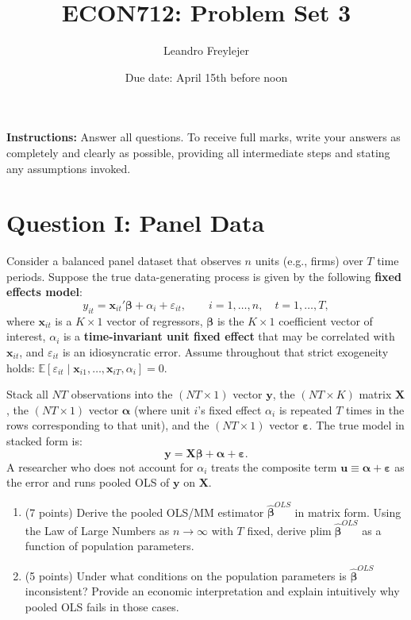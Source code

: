 \documentclass[letterpaper,12pt]{article}
\title{\vspace{-.5in} ECON712: Problem Set 3}
\author{Leandro Freylejer}
\date{Due date: April 15th before noon }
\begin{document}

\maketitle
\vspace{-.3in}
\textbf{Instructions:} Answer all questions. To receive full marks, write your answers as completely and clearly as possible, providing all intermediate steps and stating any assumptions invoked.


\section*{Question I: Panel Data}

Consider a balanced panel dataset that observes $n$ units (e.g., firms) over $T$ time periods. Suppose the true data-generating process is given by the following \textbf{fixed effects model}:
\begin{equation}
    y_{it} = \bm{x}_{it}'\bm{\beta} + \alpha_i + \varepsilon_{it}, \qquad i = 1,\ldots,n, \quad t = 1,\ldots,T,
    \label{eq:true_model}
\end{equation}
where $\bm{x}_{it}$ is a $K \times 1$ vector of regressors, $\bm{\beta}$ is the $K \times 1$ coefficient vector of interest, $\alpha_i$ is a \textbf{time-invariant unit fixed effect} that may be correlated with $\bm{x}_{it}$, and $\varepsilon_{it}$ is an idiosyncratic error. Assume throughout that strict exogeneity holds: $\mathbb{E}[\varepsilon_{it} \mid \bm{x}_{i1},\ldots,\bm{x}_{iT},\alpha_i] = 0$.

\medskip
Stack all $NT$ observations into the $(NT \times 1)$ vector $\bm{y}$, the $(NT \times K)$ matrix $\bm{X}$, the $(NT \times 1)$ vector $\bm{\alpha}$ (where unit $i$'s fixed effect $\alpha_i$ is repeated $T$ times in the rows corresponding to that unit), and the $(NT \times 1)$ vector $\bm{\varepsilon}$. The true model in stacked form is:
\begin{equation}
    \bm{y} = \bm{X}\bm{\beta} + \bm{\alpha} + \bm{\varepsilon}.
    \label{eq:stacked}
\end{equation}
A researcher who does not account for $\alpha_i$ treats the composite term $\bm{u} \equiv \bm{\alpha} + \bm{\varepsilon}$ as the error and runs pooled OLS of $\bm{y}$ on $\bm{X}$.

\begin{enumerate}[label=(\alph*)]

\item (7 points) Derive the pooled OLS/MM estimator $\hat{\bm{\beta}}^{OLS}$ in matrix form. Using the Law of Large Numbers as $n\to\infty$ with $T$ fixed, derive $\mathrm{plim}\;\hat{\bm{\beta}}^{OLS}$ as a function of population parameters. 

\item (5 points) Under what conditions on the population parameters is $\hat{\bm{\beta}}^{OLS}$ inconsistent? Provide an economic interpretation and explain intuitively why pooled OLS fails in those cases.

\end{enumerate}
\end{document}
